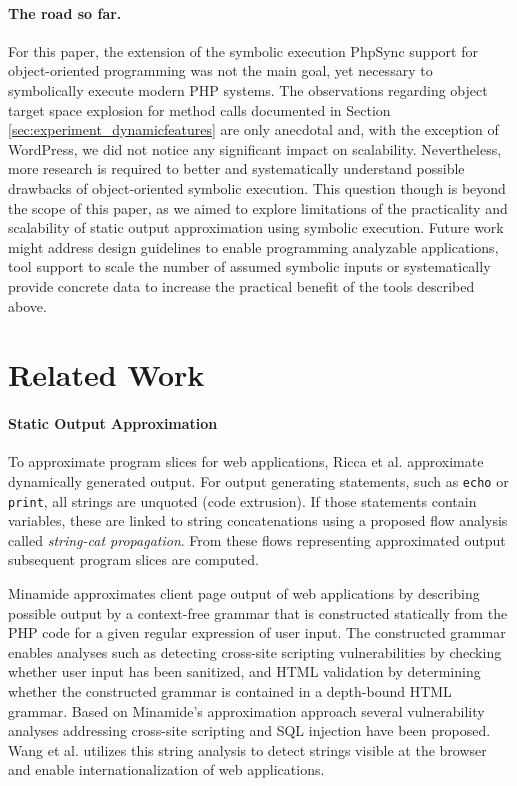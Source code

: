 \documentclass[sigconf]{acmart}
\renewcommand{\sf}[1]{\textsf{#1}}
\renewcommand{\tt}[1]{\texttt{#1}}
\begin{document}
\paragraph{The road so far.}
For this paper, the extension of the symbolic execution \sf{PhpSync} \cite{Nguyen:2014:BCG:2635868.2635928}
support for object-oriented programming was not the main goal, yet necessary to
symbolically execute modern PHP systems. The observations regarding object
target space explosion for method calls documented in Section
\ref{sec:experiment_dynamicfeatures} are only anecdotal and, with the exception
of \sf{WordPress}, we did not notice any significant impact on scalability.
Nevertheless, more research is required to better and systematically understand
possible drawbacks of object-oriented symbolic execution. 
This question though is beyond the scope of this paper, as we aimed
to explore limitations of the practicality and scalability of static output
approximation using symbolic execution. Future work might address design
guidelines to enable programming analyzable applications, tool support to scale
the number of assumed symbolic inputs or systematically provide concrete data
to increase the practical benefit of the tools described above.


\section{Related Work} \label{sec:related_work}
\paragraph{Static Output Approximation}
To approximate program slices for web
applications, Ricca et al. \cite{tonella_web_2005,tonella_2001,tonella_2002} approximate
dynamically generated output. For output generating statements, such as \tt{echo} or
\tt{print}, all strings are unquoted (code extrusion). If those statements
contain variables, these are linked to string concatenations using a
proposed flow analysis called \emph{string-cat propagation}. From these
flows representing approximated output subsequent program slices are computed.

Minamide \cite{minamide_static_2005} approximates client page output
of web applications by describing possible output by a context-free
grammar that is constructed statically from the PHP code for a given regular
expression of user input. The constructed grammar enables analyses such as
detecting cross-site scripting vulnerabilities by checking whether user input
has been sanitized, and HTML validation by determining whether the constructed
grammar is contained in a depth-bound HTML grammar. Based on Minamide's
approximation approach several vulnerability analyses addressing cross-site
scripting \cite{wassermann_static_2008} and SQL injection
\cite{wassermann2007sound} have been proposed. Wang et al.
\cite{wang_locating_2010} utilizes this string analysis to detect strings
visible at the browser and enable internationalization of web applications.
    
\end{document}
